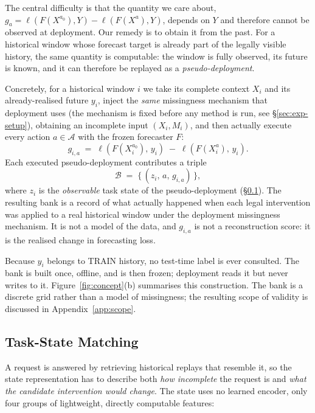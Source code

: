 \documentclass{article}
\newcommand{\calA}{\mathcal{A}}
\newcommand{\calB}{\mathcal{B}}
\newcommand{\loss}{\ell}
\begin{document}
The central difficulty is that the quantity we care about,
$g_a = \loss(F(X^{a_0}), Y) - \loss(F(X^{a}), Y)$, depends on $Y$ and therefore cannot be
observed at deployment. Our remedy is to obtain it from the past. For a historical
window whose forecast target is already part of the legally visible history, the same
quantity is computable: the window is fully observed, its future is known, and it can
therefore be replayed as a \emph{pseudo-deployment}.

Concretely, for a historical window $i$ we take its complete context $X_i$ and its
already-realised future $y_i$, inject the \emph{same} missingness mechanism that
deployment uses (the mechanism is fixed before any method is run, see
\S\ref{sec:exp-setup}), obtaining an incomplete input $(X_i, M_i)$, and then actually
execute every action $a \in \calA$ with the frozen forecaster $F$:
\begin{equation}
  g_{i,a} \;=\; \loss\!\left(F(X_i^{a_0}),\, y_i\right) \;-\; \loss\!\left(F(X_i^{a}),\, y_i\right) .
  \label{eq:replay-gain}
\end{equation}
Each executed pseudo-deployment contributes a triple
\begin{equation}
  \calB \;=\; \bigl\{\, (z_i,\, a,\, g_{i,a}) \,\bigr\},
  \label{eq:replay-bank}
\end{equation}
where $z_i$ is the \emph{observable} task state of the pseudo-deployment (\S\ref{sec:method-state}).
The resulting bank is a record of what actually happened when each legal intervention was
applied to a real historical window under the deployment missingness mechanism. It is not
a model of the data, and $g_{i,a}$ is not a reconstruction score: it is the realised
change in forecasting loss.

Because $y_i$ belongs to TRAIN history, no test-time label is ever consulted. The bank is
built once, offline, and is then frozen; deployment reads it but never writes to it.
Figure~\ref{fig:concept}(b) summarises this construction. The bank is a discrete grid
rather than a model of missingness; the resulting scope of validity is discussed in
Appendix~\ref{app:scope}.

\subsection{Task-State Matching}
\label{sec:method-state}
A request is answered by retrieving historical replays that resemble it, so the state
representation has to describe both \emph{how incomplete} the request is and \emph{what
the candidate intervention would change}. The state uses no learned encoder, only
four groups of lightweight, directly computable features:
\end{document}
